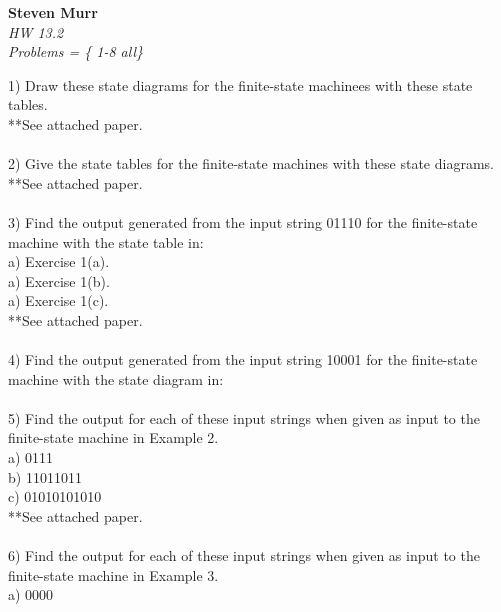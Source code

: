 \documentclass{article}
\begin{document}
\setcounter{totalnumber}{5}
   \begin{flushright}
      \Large\textbf{Steven Murr}\\
      \large\textit{HW 13.2} \\
      \large\textit{Problems = \{ 1-8 all\}}
   \end{flushright}
\begin{flushleft}
\makeatletter%
\setlength{\@fptop}{5pt}
\makeatother

\setlength\parindent{0pt}1) Draw these state diagrams for the finite-state machinees with these state tables. \\
**See attached paper. \\
~\\
\setlength\parindent{0pt}2) Give the state tables for the finite-state machines with these state diagrams. \\
**See attached paper. \\
~\\\setlength\parindent{0pt}3) Find the output generated from the input string 01110 for the finite-state machine with the state table in: \\
\setlength\parindent{24pt}a) Exercise 1(a). \\
\setlength\parindent{24pt}a) Exercise 1(b). \\
\setlength\parindent{24pt}a) Exercise 1(c). \\
**See attached paper. \\
~\\
\setlength\parindent{0pt}4) Find the output generated from the input string 10001 for the finite-state machine with the state diagram in: \\
~\\
\setlength\parindent{0pt}5) Find the output for each of these input strings when given as input to the finite-state machine in Example 2. \\
\setlength\parindent{24pt}a) 0111 \\
\setlength\parindent{24pt}b) 11011011 \\
\setlength\parindent{24pt}c) 01010101010 \\
**See attached paper. \\
~\\
\setlength\parindent{0pt}6) Find the output for each of these input strings when given as input to the finite-state machine in Example 3. \\
\setlength\parindent{24pt}a) 0000 \\

\end{flushleft}
\end{document}

